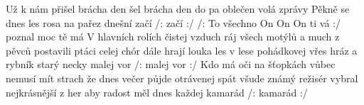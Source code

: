 \begin{TEXT}{Už k nám přišel brácha den}
\SLOKA {}  šel brácha den do pa oblečen \NL
volá   zprávy  \NL
Pěkně  se dnes les rosa  na pařez \NL
dnešní   začí /: začí :/ 
\REFREN  /: To všechno  On On On ti vá :/ \NL
{} poznal  moc tě má  
\SLOKA V hlavních rolích čistej vzduch \NL
ráj všech motýlů a much \NL
z pěvců postavili ptáci celej chór \NL
dále hrají louka les v lese pohádkovej vřes \NL
hráz a rybník starý necky malej vor /: malej vor :/ 
\SLOKA Kdo má oči na šťopkách vůbec nemusí mít strach \NL
že dnes večer půjde otrávenej spát \NL
všude známý režisér vybral nejkrásnější z her \NL
aby radost měl dnes každej kamarád /: kamarád :/ \NL
\end{TEXT}
